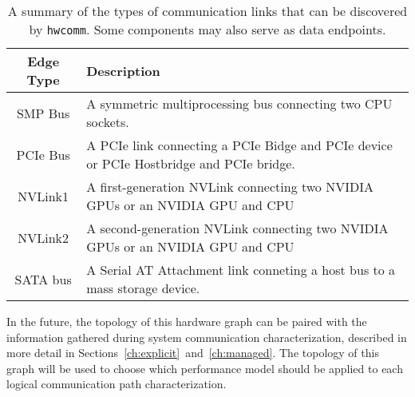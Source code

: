 \begin{table}[]
    \centering
    \caption[Discoverable edge types]{
        A summary of the types of communication links that can be discovered by \texttt{hwcomm}.
        Some components may also serve as data endpoints.
    }
    \label{tab:topology-edges}
    \begin{tabularx}{\linewidth}{ |c | >{\centering\arraybackslash}X |}
    \hline
    \textbf{Edge Type} & \textbf{Description} \\ \hline
    SMP Bus            & A symmetric multiprocessing bus connecting two CPU sockets. \\ \hline
    PCIe Bus           & A PCIe link connecting a PCIe Bidge and PCIe device or PCIe Hostbridge and PCIe bridge. \\ \hline
    NVLink1            & A first-generation NVLink connecting two NVIDIA GPUs or an NVIDIA GPU and CPU \\ \hline
    NVLink2            & A second-generation NVLink connecting two NVIDIA GPUs or an NVIDIA GPU and CPU \\ \hline
    SATA bus           & A Serial AT Attachment link conneting a host bus to a mass storage device. \\ \hline
    \end{tabularx}
\end{table}

In the future, the topology of this hardware graph can be paired with the information gathered during system communication characterization, described in more detail in Sections~\ref{ch:explicit}~and~\ref{ch:managed}.
The topology of this graph will be used to choose which performance model should be applied to each logical communication path characterization.
